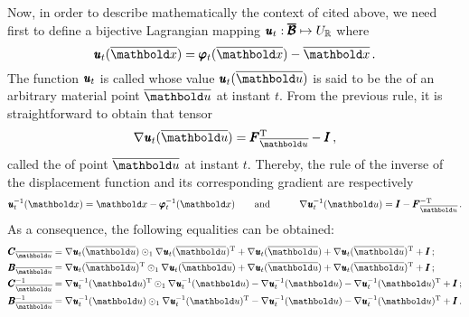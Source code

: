 Now, in order to describe mathematically the context of  cited above, we need first to define a bijective Lagrangian mapping $\pmb{\mathit{u}}_t : \pmb{\overline{\mathcal{B}}} \mapsto U_{\mathbb{R}}$ where 
\begin{equation}\label{eq:displac}
 \fua{\tnr{\mathit{u}}_t}{\overline{\vto{x}}}=\fua{\tnr{\varphi}_t}{\overline{\vto{x}}} - \overline{\vto{x}}\,.
 \end{equation} 
 The function $\pmb{\mathit{u}}_t$ is called  whose value $\fua{\tnr{\mathit{u}}_t}{\overline{\vto{u}}}$ is said to be the  of an arbitrary material point $\overline{\vto{u}}$ at instant $t$. From the previous rule, it is straightforward to obtain that tensor       
\begin{equation}\label{eq:gradDispla}
\fua{\nabla\tnr{\mathit{u}}_t}{\overline{\vto{u}}}=\tnr{F}_{\overline{\vto{u}}}^{\text{T}} - \tnr{I}\,,
\end{equation} 
called the  of point $\overline{\vto{u}}$ at instant $t$. Thereby, the rule of the inverse of the displacement function and its corresponding gradient are respectively
\begin{alignat}{3} \label{eq:invDisplace}
\fua{\tnr{\mathit{u}}_t^{-1}}{\vto{x}}=\vto{x}-\fua{\tnr{\varphi}_t^{-1}}{\vto{x}}&\qquad \text{and}\qquad & \fua{\nabla\tnr{\mathit{u}}_t^{-1}}{\vto{u}}=\tnr{I}-\tnr{F}_{\overline{\vto{u}}}^{-\text{T}}\,.
\end{alignat}
As a consequence, the following equalities can be obtained:
\begin{equation}
\begin{aligned} 
\tnr{C}_{\overline{\vto{u}}}&=\fua{\nabla\tnr{\mathit{u}}_t}{\overline{\vto{u}}}\odot_1\fua{\nabla\tnr{\mathit{u}}_t}{\overline{\vto{u}}}^{\text{T}}+\fua{\nabla\tnr{\mathit{u}}_t}{\overline{\vto{u}}}+\fua{\nabla\tnr{\mathit{u}}_t}{\overline{\vto{u}}}^{\text{T}}+\tnr{I}\,;\\
\tnr{B}_{\overline{\vto{u}}}&=\fua{\nabla\tnr{\mathit{u}}_t}{\overline{\vto{u}}}^{\text{T}}\odot_1\fua{\nabla\tnr{\mathit{u}}_t}{\overline{\vto{u}}}+\fua{\nabla\tnr{\mathit{u}}_t}{\overline{\vto{u}}}+\fua{\nabla\tnr{\mathit{u}}_t}{\overline{\vto{u}}}^{\text{T}}+\tnr{I}\,;\\
\tnr{C}_{\overline{\vto{u}}}^{-1}&=\fua{\nabla\tnr{\mathit{u}}_t^{-1}}{\vto{u}}^\text{T}\odot_1\fua{\nabla\tnr{\mathit{u}}_t^{-1}}{\vto{u}}-\fua{\nabla\tnr{\mathit{u}}_t^{-1}}{\vto{u}}-\fua{\nabla\tnr{\mathit{u}}_t^{-1}}{\vto{u}}^{\text{T}}+\tnr{I}\,;\\
\tnr{B}_{\overline{\vto{u}}}^{-1}&=\fua{\nabla\tnr{\mathit{u}}_t^{-1}}{\vto{u}}\odot_1\fua{\nabla\tnr{\mathit{u}}_t^{-1}}{\vto{u}}^\text{T}-\fua{\nabla\tnr{\mathit{u}}_t^{-1}}{\vto{u}}-\fua{\nabla\tnr{\mathit{u}}_t^{-1}}{\vto{u}}^{\text{T}}+\tnr{I}\,.
\end{aligned}
\end{equation}

